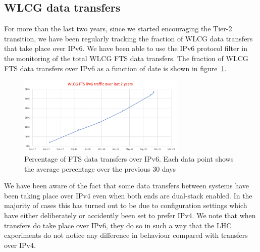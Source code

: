 
\subsection{WLCG data transfers}

For more than the last two years, since we started encouraging the Tier-2 transition, we have been regularly tracking the fraction of WLCG data transfers that take place over IPv6. We have been able to use the IPv6 protocol filter in the monitoring of the total WLCG FTS \cite{fts3} data transfers.
The fraction of WLCG FTS data transfers over IPv6 as a function of date is shown in  figure~\ref{fig:FTS}.
\begin{figure}[h]
\centering
\includegraphics[width=8cm]{FTS}
\caption{Percentage of FTS data transfers over IPv6. Each data point shows the average percentage over the previous 30 days}
\label{fig:FTS}
\end{figure}
\par We have been aware of the fact that some data transfers between systems have been taking place over IPv4 even when both ends are dual-stack enabled. In the majority of cases this has turned out to be due to configuration settings which have either deliberately or accidently been set to prefer IPv4. We note that when transfers do take place over IPv6, they do so in such a way that the LHC experiments do not notice any difference in behaviour compared with transfers over IPv4.
